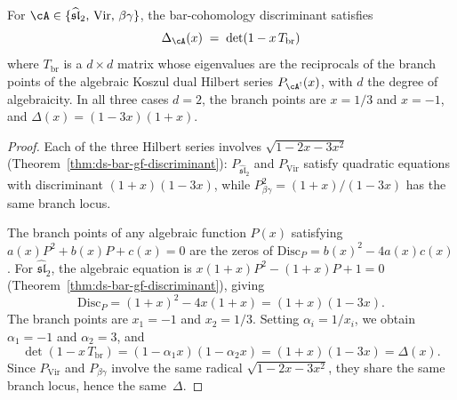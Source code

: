 \begin{theorem}
\label{thm:discriminant-spectral-verified}
For $\cA \in \{\widehat{\mathfrak{sl}}_2,\, \mathrm{Vir},\,
\beta\gamma\}$, the bar-cohomology discriminant satisfies
\[
\Delta_{\cA}(x) \;=\; \det(1 - x\, T_{\mathrm{br}})
\]
where $T_{\mathrm{br}}$ is a $d \times d$ matrix whose eigenvalues
are the reciprocals of the branch points of the algebraic Koszul
dual Hilbert series $P_{\cA^!}(x)$, with $d$ the degree of
algebraicity.
In all three cases $d = 2$, the branch points are $x = 1/3$
and $x = -1$, and
$\Delta(x) = (1 - 3x)(1 + x)$.
\end{theorem}

\begin{proof}
Each of the three Hilbert series involves $\sqrt{1 - 2x - 3x^2}$
(Theorem~\ref{thm:ds-bar-gf-discriminant}):
$P_{\widehat{\mathfrak{sl}}_2}$ and $P_{\mathrm{Vir}}$ satisfy
quadratic equations with discriminant $(1+x)(1-3x)$, while
$P_{\beta\gamma}^2 = (1+x)/(1-3x)$ has the same branch locus.

The branch points of any algebraic function $P(x)$ satisfying
$a(x)P^2 + b(x)P + c(x) = 0$ are the zeros of
$\mathrm{Disc}_P = b(x)^2 - 4a(x)c(x)$.  For
$\widehat{\mathfrak{sl}}_2$, the algebraic equation is
$x(1+x)P^2 - (1+x)P + 1 = 0$
(Theorem~\ref{thm:ds-bar-gf-discriminant}), giving
\[
\mathrm{Disc}_P = (1+x)^2 - 4x(1+x) = (1+x)(1-3x).
\]
The branch points are $x_1 = -1$ and $x_2 = 1/3$.
Setting $\alpha_i = 1/x_i$, we obtain $\alpha_1 = -1$ and
$\alpha_2 = 3$, and
\[
\det(1 - x\,T_{\mathrm{br}}) = (1 - \alpha_1 x)(1 - \alpha_2 x)
= (1+x)(1-3x) = \Delta(x).
\]
Since $P_{\mathrm{Vir}}$ and $P_{\beta\gamma}$ involve the same
radical $\sqrt{1-2x-3x^2}$, they share the same branch locus,
hence the same~$\Delta$.
\end{proof}

